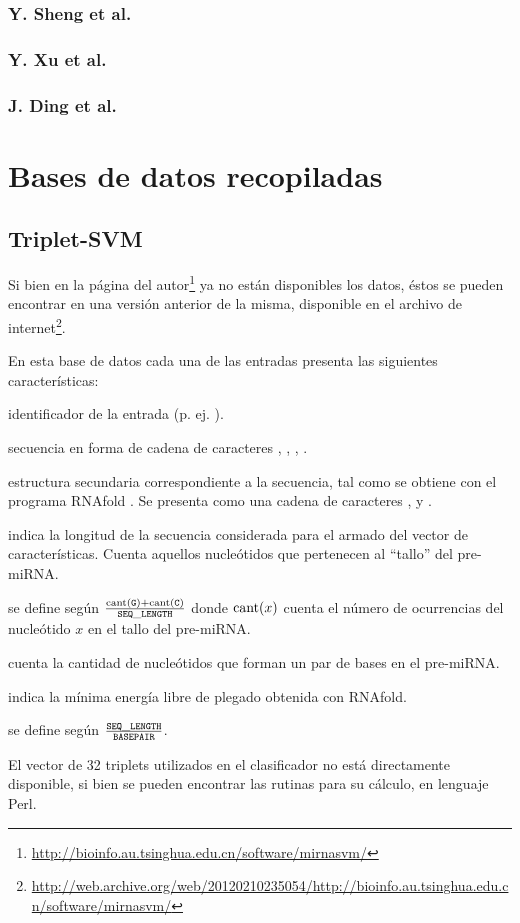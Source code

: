 \documentclass[12pt,bibliography=oldstyle,DIV=12,parskip=half-,titlepage]{scrartcl}
\begin{document}
\subsubsection*{Y. Sheng et al. \cite{sheng}}
%
\subsubsection*{Y. Xu et al. \cite{xu}}
%
\subsubsection*{J. Ding et al. \cite{ding}}
%
%
%
%
\section{Bases de datos recopiladas}
%
\subsection{Triplet-SVM \cite{xue}}
%
Si bien en la página del
autor\footnote{\url{http://bioinfo.au.tsinghua.edu.cn/software/mirnasvm/}}
ya no están disponibles los datos, éstos se pueden encontrar en una
versión anterior de la misma, disponible en el archivo de
internet\footnote{\url{http://web.archive.org/web/20120210235054/http://bioinfo.au.tsinghua.edu.cn/software/mirnasvm/}}.

En esta base de datos cada una de las entradas presenta las siguientes
características:
\begin{description*}
%
\item[identificador] de la entrada (p. ej. ).
%
\item[secuencia] en forma de cadena de caracteres , ,
  , .
%
\item[estructura secundaria] correspondiente a la secuencia, tal como
  se obtiene con el programa RNAfold \cite{vienna}. Se presenta como
  una cadena de caracteres \mono{(},  y \mono{)}.
%
\item[\mono{SEQ\_LENGTH}] indica la longitud de la secuencia
  considerada para el armado del vector de características. Cuenta
  aquellos nucleótidos que pertenecen al ``tallo'' del pre-miRNA.
%
\item[\mono{GC\_CONTENT}] se define según
  $\frac{\textrm{cant}({\tt G})+\textrm{cant}({\tt C})}{{\tt SEQ\_LENGTH}}$
  donde $\textrm{cant}(x)$ cuenta el número de ocurrencias del nucleótido
  $x$ en el tallo del pre-miRNA.
%
\item[\mono{BASEPAIR}] cuenta la cantidad de nucleótidos
  que forman un par de bases en el pre-miRNA.
%
\item[\mono{FREE\_ENERGY}] indica la mínima energía libre de plegado
  obtenida con RNAfold.
%
\item[\mono{LEN\_BP\_RATIO}] se define según
  $\frac{{\tt SEQ\_LENGTH}}{{\tt BASEPAIR}}$.
\end{description*}
%
El vector de 32 triplets utilizados en el clasificador no está
directamente disponible, si bien se pueden encontrar las rutinas para su
cálculo, en lenguaje Perl.
%
\end{document}
